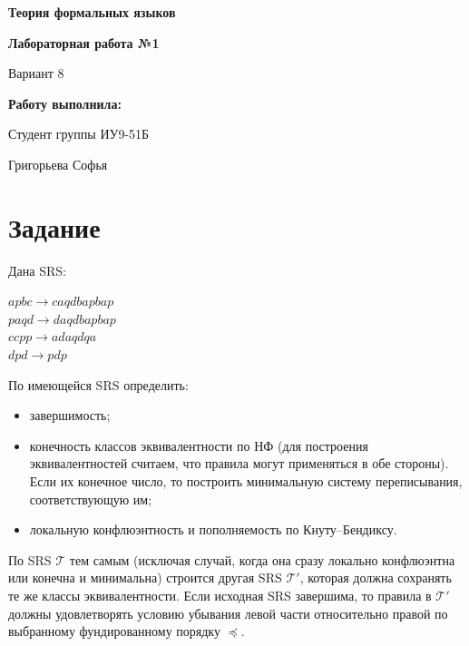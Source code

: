 \documentclass[a4paper,12pt]{article}
\newcommand{\T}{\mathcal{T}}
\begin{document}
\begin{titlepage}
\centering

{\LARGE \textbf{Теория формальных языков} \par}
\vspace{0.5cm}

{\large \textbf{Лабораторная работа №1} \par}
{\large Вариант 8 \par}
\vspace{1.5cm}

{\large \textbf{Работу выполнила:} \par}
{\large Студент группы ИУ9-51Б \par}
{\large Григорьева Софья \par}

\end{titlepage}



\tableofcontents
\newpage


\section{Задание}

Дана SRS:
\begin{flushleft}
$apbc \rightarrow caqdbapbap$\\
$paqd \rightarrow daqdbapbap$\\
$ccpp \rightarrow adaqdqa$\\
$dpd \rightarrow pdp$\\
\end{flushleft}

По имеющейся SRS определить:
\begin{itemize}
    \item[---] завершимость;
    \item[---] конечность классов эквивалентности по НФ (для построения 
    эквивалентностей считаем, что правила могут применяться в обе стороны). 
    Если их конечное число, то построить минимальную систему переписывания, 
    соответствующую им;
    \item[---] локальную конфлюэнтность и пополняемость по Кнуту–Бендиксу.
\end{itemize}

По SRS $\mathcal{T}$ тем самым (исключая случай, когда она сразу локально 
конфлюэнтна или конечна и минимальна) строится другая SRS $\T'$, которая 
должна сохранять те же классы эквивалентности. Если исходная SRS завершима, 
то правила в $\T'$ должны удовлетворять условию убывания левой части 
относительно правой по выбранному фундированному порядку $\preceq$.
\end{document}
